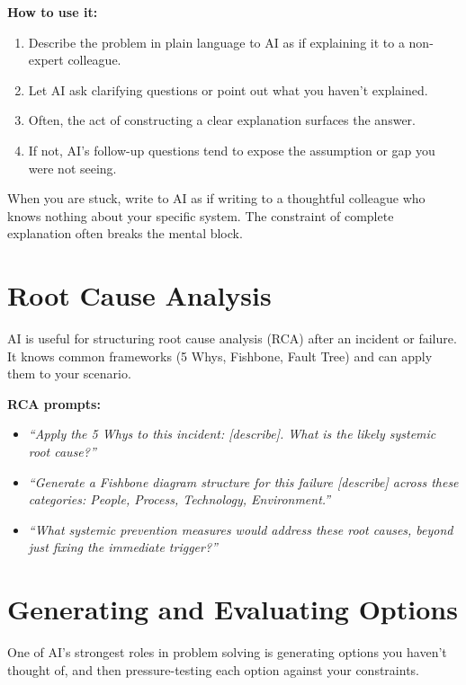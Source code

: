 \textbf{How to use it:}
\begin{enumerate}
  \item Describe the problem in plain language to AI as if explaining it to a
        non-expert colleague.
  \item Let AI ask clarifying questions or point out what you haven't explained.
  \item Often, the act of constructing a clear explanation surfaces the answer.
  \item If not, AI's follow-up questions tend to expose the assumption or gap you
        were not seeing.
\end{enumerate}

\begin{tipbox}
When you are stuck, write to AI as if writing to a thoughtful colleague who knows
nothing about your specific system.
The constraint of complete explanation often breaks the mental block.
\end{tipbox}

\section{Root Cause Analysis}
\label{sec:rca}

AI is useful for structuring root cause analysis (RCA) after an incident or failure.
It knows common frameworks (5 Whys, Fishbone, Fault Tree) and can apply them to
your scenario.

\textbf{RCA prompts:}
\begin{itemize}
  \item \textit{``Apply the 5 Whys to this incident: [describe]. What is the likely systemic root cause?''}
  \item \textit{``Generate a Fishbone diagram structure for this failure [describe] across these categories: People, Process, Technology, Environment.''}
  \item \textit{``What systemic prevention measures would address these root causes, beyond just fixing the immediate trigger?''}
\end{itemize}

\section{Generating and Evaluating Options}
\label{sec:options}

One of AI's strongest roles in problem solving is generating options you haven't
thought of, and then pressure-testing each option against your constraints.

